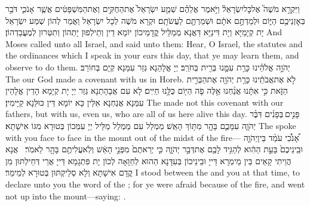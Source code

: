 \newperek
{}
{וַיִּקְרָ֣א מֹשֶׁה֮ אֶל\maqqaf כׇּל\maqqaf יִשְׂרָאֵל֒ וַיֹּ֣אמֶר אֲלֵהֶ֗ם שְׁמַ֤ע יִשְׂרָאֵל֙ אֶת\maqqaf הַחֻקִּ֣ים וְאֶת\maqqaf הַמִּשְׁפָּטִ֔ים אֲשֶׁ֧ר אָנֹכִ֛י דֹּבֵ֥ר בְּאׇזְנֵיכֶ֖ם הַיּ֑וֹם וּלְמַדְתֶּ֣ם אֹתָ֔ם וּשְׁמַרְתֶּ֖ם לַעֲשֹׂתָֽם׃}
{וּקְרָא מֹשֶׁה לְכָל יִשְׂרָאֵל וַאֲמַר לְהוֹן שְׁמַע יִשְׂרָאֵל יָת קְיָמַיָּא וְיָת דִּינַיָּא דַּאֲנָא מְמַלֵּיל קֳדָמֵיכוֹן יוֹמָא דֵין וְתֵילְפוּן יָתְהוֹן וְתִטְּרוּן לְמֶעֱבַדְהוֹן׃}
{And Moses called unto all Israel, and said unto them: Hear, O Israel, the statutes and the ordinances which I speak in your ears this day, that ye may learn them, and observe to do them.}{}
{יְהֹוָ֣ה אֱלֹהֵ֗ינוּ כָּרַ֥ת עִמָּ֛נוּ בְּרִ֖ית בְּחֹרֵֽב׃}
{יְיָ אֱלָהַנָא גְּזַר עִמַּנָא קְיָם בְּחוֹרֵב׃}
{The \lord\space our God made a covenant with us in Horeb.}{}
{לֹ֣א אֶת\maqqaf אֲבֹתֵ֔ינוּ כָּרַ֥ת יְהֹוָ֖ה אֶת\maqqaf הַבְּרִ֣ית הַזֹּ֑את כִּ֣י אִתָּ֔נוּ אֲנַ֨חְנוּ אֵ֥לֶּה פֹ֛ה הַיּ֖וֹם כֻּלָּ֥נוּ חַיִּֽים׃}
{לָא עִם אֲבָהָתַנָא גְּזַר יְיָ יָת קְיָמָא הָדֵין אֱלָהֵין עִמַּנָא אֲנַחְנָא אִלֵּין כָּא יוֹמָא דֵּין כּוּלַּנָא קַיָּימִין׃}
{The \lord\space made not this covenant with our fathers, but with us, even us, who are all of us here alive this day.}{}
{פָּנִ֣ים \legarmeh  בְּפָנִ֗ים דִּבֶּ֨ר יְהֹוָ֧ה עִמָּכֶ֛ם בָּהָ֖ר מִתּ֥וֹךְ הָאֵֽשׁ׃}
{מַמְלַל עִם מַמְלַל מַלֵּיל יְיָ עִמְּכוֹן בְּטוּרָא מִגּוֹ אִישָׁתָא׃}
{The \lord\space spoke with you face to face in the mount out of the midst of the fire—}{}
{אָ֠נֹכִ֠י עֹמֵ֨ד בֵּין\maqqaf יְהֹוָ֤ה וּבֵֽינֵיכֶם֙ בָּעֵ֣ת הַהִ֔וא לְהַגִּ֥יד לָכֶ֖ם אֶת\maqqaf דְּבַ֣ר יְהֹוָ֑ה כִּ֤י יְרֵאתֶם֙ מִפְּנֵ֣י הָאֵ֔שׁ וְלֹֽא\maqqaf עֲלִיתֶ֥ם בָּהָ֖ר לֵאמֹֽר׃ \setuma }
{אֲנָא הֲוֵיתִי קָאֵים בֵּין מֵימְרָא דַּייָ וּבֵינֵיכוֹן בְּעִדָּנָא הַהוּא לְחַוָּאָה לְכוֹן יָת פִּתְגָמָא דַּייָ אֲרֵי דְּחֵילְתּוּן מִן קֳדָם אִישָׁתָא וְלָא סְלֵיקְתּוּן בְּטוּרָא לְמֵימַר׃}
{I stood between the \lord\space and you at that time, to declare unto you the word of the \lord; for ye were afraid because of the fire, and went not up into the mount—saying: .}{}
